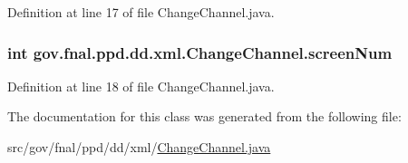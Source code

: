 Definition at line 17 of file Change\-Channel.\-java.

\hypertarget{classgov_1_1fnal_1_1ppd_1_1dd_1_1xml_1_1ChangeChannel_a765f6f82d7f2468415ebbc4b621df191}{
\subsubsection[{screen\-Num}]{\setlength{\rightskip}{0pt plus 5cm}int gov.\-fnal.\-ppd.\-dd.\-xml.\-Change\-Channel.\-screen\-Num\hspace{0.3cm}{\ttfamily [protected]}}}\label{classgov_1_1fnal_1_1ppd_1_1dd_1_1xml_1_1ChangeChannel_a765f6f82d7f2468415ebbc4b621df191}


Definition at line 18 of file Change\-Channel.\-java.



The documentation for this class was generated from the following file\-:\begin{DoxyCompactItemize}
\item 
src/gov/fnal/ppd/dd/xml/\hyperlink{ChangeChannel_8java}{Change\-Channel.\-java}\end{DoxyCompactItemize}
